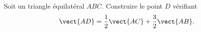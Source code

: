 
\begin{exercice}\label{exosmath-0074}

    Soit un triangle équilatéral \( ABC\). Construire le point \( D\) vérifiant
    \begin{equation}
        \vect{ AD }=\frac{ 1 }{2}\vect{ AC }+\frac{ 3 }{2}\vect{ AB }.
    \end{equation}

\end{exercice}

